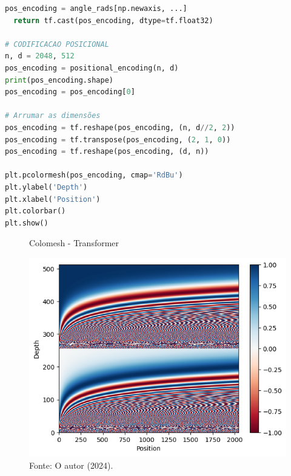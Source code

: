 \begin{lstlisting}[language=Python, style=input]
  pos_encoding = angle_rads[np.newaxis, ...]
  return tf.cast(pos_encoding, dtype=tf.float32)

# CODIFICACAO POSICIONAL
n, d = 2048, 512
pos_encoding = positional_encoding(n, d)
print(pos_encoding.shape)
pos_encoding = pos_encoding[0]

# Arrumar as dimensões
pos_encoding = tf.reshape(pos_encoding, (n, d//2, 2))
pos_encoding = tf.transpose(pos_encoding, (2, 1, 0))
pos_encoding = tf.reshape(pos_encoding, (d, n))

plt.pcolormesh(pos_encoding, cmap='RdBu')
plt.ylabel('Depth')
plt.xlabel('Position')
plt.colorbar()
plt.show()
\end{lstlisting}


\begin{figure}[H]
\centering
\caption{Colomesh - Transformer}
\includegraphics[width=.7\linewidth]{apendices/fig/9_IAA009_9.png}
\caption*{Fonte: O autor (2024).}
\end{figure}


